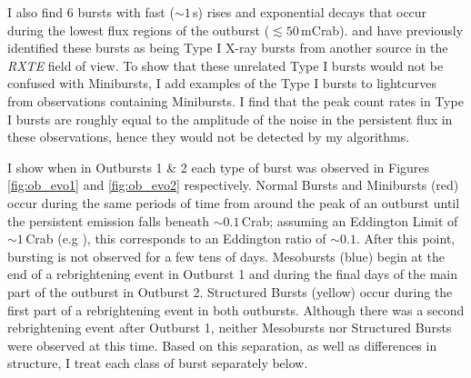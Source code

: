 \par I also find 6 bursts with fast ($\sim1$\,s) rises and exponential decays that occur during the lowest flux regions of the outburst ($\lesssim50$\,mCrab).  \citet{Strohmayer_BPFieldTypeI} and \citet{Galloway_TypeI} have previously identified these bursts as being Type I X-ray bursts from another source in the \textit{RXTE} field of view.  To show that these unrelated Type I bursts would not be confused with Minibursts, I add examples of the Type I bursts to lightcurves from observations containing Minibursts.  I find that the peak count rates in Type I bursts are roughly equal to the amplitude of the noise in the persistent flux in these observations, hence they would not be detected by my algorithms.
\par I show when in Outbursts 1 \& 2 each type of burst was observed in Figures \ref{fig:ob_evo1} and \ref{fig:ob_evo2} respectively.  Normal Bursts and Minibursts (red) occur during the same periods of time from around the peak of an outburst until the persistent emission falls beneath $\sim0.1$\,Crab; assuming an Eddington Limit of $\sim1$\,Crab (e.g \citealp{Sazonov_BPGranat}), this corresponds to an Eddington ratio of $\sim0.1$.  After this point, bursting is not observed for a few tens of days.  Mesobursts (blue) begin at the end of a rebrightening event in Outburst 1 and during the final days of the main part of the outburst in Outburst 2.  Structured Bursts (yellow) occur during the first part of a rebrightening event in both outbursts.  Although there was a second rebrightening event after Outburst 1, neither Mesobursts nor Structured Bursts were observed at this time.  Based on this separation, as well as differences in structure, I treat each class of burst separately below.

